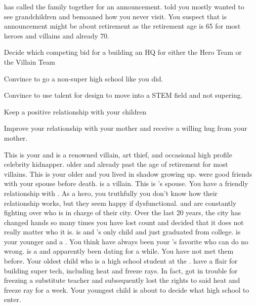 \documentclass[char]{LRSguildcamp1}
\begin{document}
\cGrandma{} has called the family together for an announcement. \cGrandma{\They} told you mostly \cGrandma{\they} wanted to see \cGrandma{\their} grandchildren and bemoaned how you never visit.  You suspect that is announcement might be about \cGrandma{\their} retirement as the retirement age is 65 for most heroes and villains and \cGrandma{\theyare} already 70.  


\begin{itemz}[Goals]
	\item Decide which competing bid for a building an HQ for either the Hero Team or the Villain Team
	\item Convince \cTween{} to go a non-super high school like you did.  
	\item Convince \cTeen{} to use \cTeen{\their} talent for design to move into a STEM field and not supering.
	\item Keep a positive relationship with your children
	\item Improve your relationship with your mother and receive a willing hug from your mother.  
	\end{itemz}

\begin{itemz}[Notes]
	\item 
\end{itemz}



\begin{contacts}
	\contact{\cGrandma{}} This is your \cGrandma{\parent} and is a renowned villain, art thief, and occasional high profile celebrity kidnapper. \cGrandma{\Theyare} older and already past the age of retirement for most villains.
	\contact{\cOldest{}} This is your older \cOldest{\sibling} and you lived in \cOldest{\their} shadow growing up. \cOldest{\They} were good friends with your spouse before \cAS{\their} death. \cOldest{} is a villain. 
	\contact{\cOS{}} This is \cOldest{}'s spouse. You have a friendly relationship with \cOS{\them}. As a hero, you truthfully you don't know how their relationship works, but they seem happy if dysfunctional.  \cOldest{} and \cOS{} are constantly fighting over who is in charge of their city.  Over the last 20 years, the city has changed hands so many times you have lost count and decided that it does not really matter who it is. 
	\contact{\cGrad{}} \cGrad{} is \cOldest{} and \cOS{}'s only child and just graduated from college. 
	\contact{\cYoungest{}} \cYoungest{} is your younger \cYoungest{\sibling} and a \cYoungest{\hero}. You think  have always been your \cGrandma{\parent}'s favorite who can do no wrong. 
	\contact{\cYS{}} \cYS{} is a \cYS{\hero} and apparently been dating \cYoungest{} for a while. You have not met them before. 
	\contact{\cTeen{}} Your oldest child who is a high school student at the \pNormalSchool{}. \cTeen{\They} have a flair for building super tech, including heat and freeze rays. In fact, \cTeen{} got in trouble for freezing a substitute teacher and subsequently lost the rights to said heat and freeze ray for a week. 
	\contact{\cTween{}} Your youngest child is about to decide what high school to enter.
\end{contacts}
\end{document}
